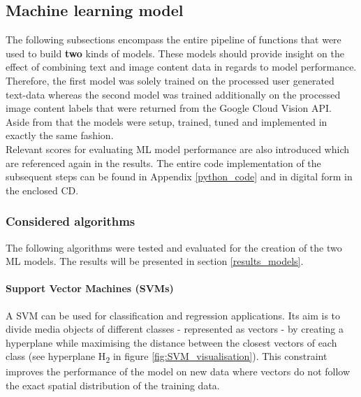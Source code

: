 \subsection{Machine learning model} \label{ml_model}
The following subsections encompass the entire pipeline of functions that were used to build \textbf{two} kinds of models. These models should provide insight on the effect of combining text and image content data in regards to model performance. Therefore, the first model was solely trained on the processed user generated text-data whereas the second model was trained additionally on the processed image content labels that were returned from the Google Cloud Vision API. Aside from that the models were setup, trained, tuned and implemented in exactly the same fashion.\\
Relevant scores for evaluating ML model performance are also introduced which are referenced again in the results. The entire code implementation of the subsequent steps can be found in Appendix \ref{python_code} and in digital form in the enclosed CD.

\subsubsection*{Considered algorithms} \label{ml_algorithms}
The following algorithms were tested and evaluated for the creation of the two ML models. The results will be presented in section \ref{results_models}.

\paragraph*{Support Vector Machines (SVMs)}
A SVM can be used for classification and regression applications. Its aim is to divide media objects of different classes - represented as vectors - by creating a hyperplane while maximising the distance between the closest vectors of each class (see hyperplane H\textsubscript{2} in figure \ref{fig:SVM_visualisation}). This constraint improves the performance of the model on new data where vectors do not follow the exact spatial distribution of the training data.

